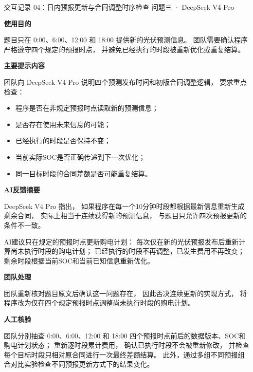 \documentclass[UTF8,a4paper,11pt]{ctexart}
\newcommand{\recorditem}[1]{%
    \par\vspace{0.28em}
    \noindent\textbf{#1}\quad
}
\begin{document}
\begin{recordbox}
{交互记录 04：日内预报更新与合同调整时序检查}
{问题三 · DeepSeek V4 Pro}

\recorditem{使用目的}
题目只在
0:00、6:00、12:00 和 18:00
提供新的光伏预测信息。
团队需要确认程序严格遵守四个规定的预报时点，
并避免已经执行的时段被重新优化或重复结算。

\recorditem{主要提示内容}
团队向 DeepSeek V4 Pro 说明四个预测发布时间和初版合同调整逻辑，
要求重点检查：

\begin{itemize}
    \item 程序是否在非规定预报时点读取新的预测信息；
    \item 是否存在使用未来信息的可能；
    \item 已经执行的时段是否保持不变；
    \item 当前实际SOC是否正确传递到下一次优化；
    \item 同一目标时段的合同差额是否可能重复结算。
\end{itemize}

\recorditem{AI反馈摘要}
DeepSeek V4 Pro 指出，
如果程序在每一个10分钟时段都根据最新信息重新生成剩余合同，
实际上相当于连续获得新的预测信息，
与题目只允许四次预报更新的条件不一致。

AI建议只在规定的预报时点更新购电计划：
每次仅在新的光伏预报发布后重新计算尚未执行时段的购电计划；
已经执行的时段不再调整，已发生费用不再改变；
剩余时段根据当前SOC和当前已知信息重新优化。

\recorditem{团队处理}
团队重新核对题目原文后确认这一问题存在，
因此否决连续更新的实现方式，
将程序改为仅在四个规定预报时点调整尚未执行时段的购电计划。

\recorditem{人工核验}
团队分别抽查
0:00、6:00、12:00 和 18:00
四个预报时点前后的数据版本、SOC和购电计划状态；
重新逐时段累计费用，
确认已执行时段不会被重新修改，
并检查每个目标时段只相对原合同进行一次最终差额结算。
此外，通过多组不同预报组合对比实验检查不同预报更新方式下的结果变化。

\end{recordbox}
\end{document}
